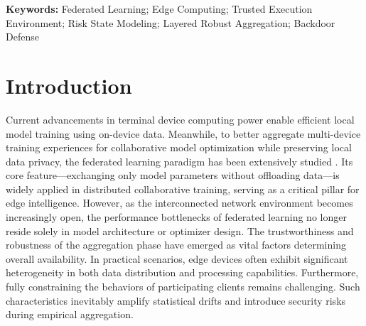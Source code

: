 \documentclass[11pt, a4paper]{article}
\begin{document}
\noindent\textbf{Keywords:} Federated Learning; Edge Computing; Trusted Execution Environment; Risk State Modeling; Layered Robust Aggregation; Backdoor Defense

\section{Introduction}

Current advancements in terminal device computing power enable efficient local model training using on-device data. Meanwhile, to better aggregate multi-device training experiences for collaborative model optimization while preserving local data privacy, the federated learning paradigm has been extensively studied \cite{kairouz2021flsurvey}. Its core feature—exchanging only model parameters without offloading data—is widely applied in distributed collaborative training, serving as a critical pillar for edge intelligence. However, as the interconnected network environment becomes increasingly open, the performance bottlenecks of federated learning no longer reside solely in model architecture or optimizer design. The trustworthiness and robustness of the aggregation phase have emerged as vital factors determining overall availability. In practical scenarios, edge devices often exhibit significant heterogeneity in both data distribution and processing capabilities. Furthermore, fully constraining the behaviors of participating clients remains challenging. Such characteristics inevitably amplify statistical drifts and introduce security risks during empirical aggregation.
\end{document}
